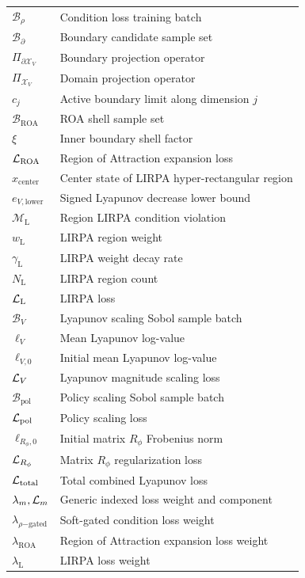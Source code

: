 \begin{longtable}{@{} p{} p{} @{}}
$\mathcal{B}_\rho$ & Condition loss training batch \\
$\mathcal{B}_{\partial}$ & Boundary candidate sample set \\
$\Pi_{\partial \mathcal{X}_V}$ & Boundary projection operator \\
$\Pi_{\mathcal{X}_V}$ & Domain projection operator \\
$c_j$ & Active boundary limit along dimension $j$ \\
$\mathcal{B}_{\mathrm{ROA}}$ & ROA shell sample set \\
$\xi$ & Inner boundary shell factor \\
$\mathcal{L}_{\mathrm{ROA}}$ & Region of Attraction expansion loss \\
$x_{\mathrm{center}}$ & Center state of LIRPA hyper-rectangular region \\
$e_{V,\mathrm{lower}}$ & Signed Lyapunov decrease lower bound \\
$\mathcal{M}_{\mathrm{L}}$ & Region LIRPA condition violation \\
$w_{\mathrm{L}}$ & LIRPA region weight \\
$\gamma_{\mathrm{L}}$ & LIRPA weight decay rate \\
$N_{\mathrm{L}}$ & LIRPA region count \\
$\mathcal{L}_{\mathrm{L}}$ & LIRPA loss \\
$\mathcal{B}_V$ & Lyapunov scaling Sobol sample batch \\
$\ell_V$ & Mean Lyapunov log-value \\
$\ell_{V,0}$ & Initial mean Lyapunov log-value \\
$\mathcal{L}_V$ & Lyapunov magnitude scaling loss \\
$\mathcal{B}_{\mathrm{pol}}$ & Policy scaling Sobol sample batch \\
$\mathcal{L}_{\mathrm{pol}}$ & Policy scaling loss \\
$\ell_{R_\phi,0}$ & Initial matrix $R_\phi$ Frobenius norm \\
$\mathcal{L}_{R_\phi}$ & Matrix $R_\phi$ regularization loss \\
$\mathcal{L}_{\mathrm{total}}$ & Total combined Lyapunov loss \\
$\lambda_m, \mathcal{L}_m$ & Generic indexed loss weight and component \\
$\lambda_{\rho\mathrm{-gated}}$ & Soft-gated condition loss weight \\
$\lambda_{\mathrm{ROA}}$ & Region of Attraction expansion loss weight \\
$\lambda_{\mathrm{L}}$ & LIRPA loss weight \\

\end{longtable}
